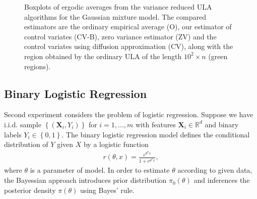 \documentclass[bj]{imsart}
\begin{document}
 \begin{figure}[tbh]
\centering
{}
\qquad
{}
\caption{Boxplots of ergodic averages  from the variance reduced ULA algorithms for the Gaussian mixture model. The compared estimators are the ordinary empirical average  (O), our estimator of control variates (CV-B), zero variance estimator (ZV) and the control variates using diffusion approximation (CV), along with the region obtained by the ordinary ULA of the length $10^2 \times n$ (green regions). \label{fig:1}}
\end{figure}

\subsection{Binary Logistic Regression}

Second experiment considers the problem of logistic regression. Suppose we have i.i.d. sample $\left\{ (\mathbf{X}_i, Y_i)\right\}$ for $ i =1, \dots , m$ with features $\mathbf{X}_i \in \mathbb{R}^d $ and binary labels $Y_i \in \left\{0,1 \right\}$. The binary logistic regression model defines the conditional distribution of $Y$ given $X$ by a logistic function
\begin{eqnarray*}
r(\theta, x) = \frac{e^{\theta^T x}}{1 + e^{\theta^T x}},
\end{eqnarray*}
where $\theta$ is a parameter of model. In order to estimate $\theta$ according to given data, the Bayessian approach introduces prior distribution $\pi_0(\theta)$ and inferences the posterior density $\pi(\theta)$ using Bayes' rule.
\end{document}
